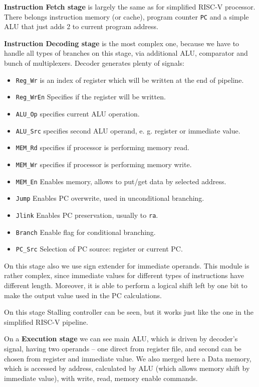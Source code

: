 \documentclass[a4paper]{article}
\begin{document}
\textbf{Instruction Fetch stage} is largely the same as for simplified RISC-V processor. There belongs instruction memory (or cache), program counter \texttt{PC} and a simple ALU that just adds 2 to current program address.

\textbf{Instruction Decoding stage} is the most complex one, because we have to handle all types of branches on this stage, via additional ALU, comparator and bunch of multiplexers. 
Decoder generates plenty of signals:
\begin{itemize}
    \item \texttt{Reg\_Wr} is an index of register which will be written at the end of pipeline.
    \item \texttt{Reg\_WrEn} Specifies if the register will be written.
    \item \texttt{ALU\_Op} specifies current ALU operation.
    \item \texttt{ALU\_Src} specifies second ALU operand, e. g. register or immediate value.
    \item \texttt{MEM\_Rd} specifies if processor is performing memory read.
    \item \texttt{MEM\_Wr} specifies if processor is performing memory write.
    \item \texttt{MEM\_En} Enables memory, allows to put/get data by selected address.
    \item \texttt{Jump} Enables PC overwrite, used in unconditional branching.
    \item \texttt{Jlink} Enables PC preservation, usually to \texttt{ra}.
    \item \texttt{Branch} Enable flag for conditional branching.
    \item \texttt{PC\_Src} Selection of PC source: register or current PC.
\end{itemize}

On this stage also we use sign extender for immediate operands.
This module is rather complex, since immediate values for different types of instructions have different length.
Moreover, it is able to perform a logical shift left by one bit to make the output value used in the PC calculations.

On this stage Stalling controller can be seen, but it works just like the one in the simplified RISC-V pipeline.

On a \textbf{Execution stage} we can see main ALU, which is driven by decoder's signal, having two operands -- one direct from register file, and second can be chosen from register and immediate value.
We also merged here a Data memory, which is accessed by address, calculated by ALU (which allows memory shift by immediate value), with write, read, memory enable commands.
\end{document}
